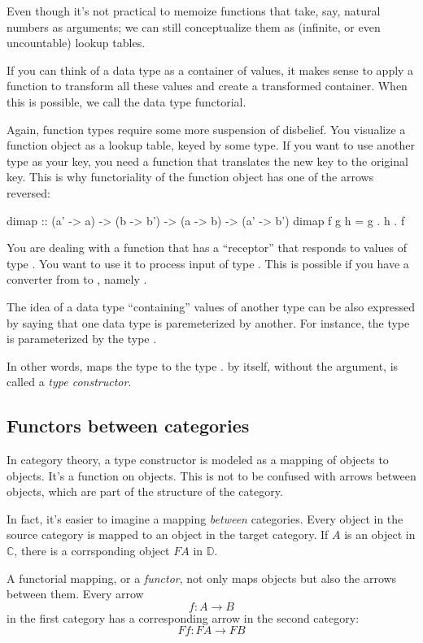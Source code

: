 \documentclass[DaoFP]{subfiles}
\begin{document}
Even though it's not practical to memoize functions that take, say, natural numbers as arguments; we can still conceptualize them as (infinite, or even uncountable) lookup tables.

If you can think of a data type as a container of values, it makes sense to apply a function to transform all these values and create a transformed container. When this is possible, we call the data type functorial. 

Again, function types require some more suspension of disbelief. You visualize a function object as a lookup table, keyed by some type. If you want to use another type as your key, you need a function that translates the new key to the original key. This is why functoriality of the function object has one of the arrows reversed:
\begin{haskell}
dimap :: (a' -> a) -> (b -> b') -> (a -> b) -> (a' -> b')
dimap f g h = g . h . f
\end{haskell}
You are dealing with a function  that has a ``receptor'' that responds to values of type . You want to use it to process input of type . This is possible if you have a converter from  to , namely .


The idea of a data type ``containing'' values of another type can be also expressed by saying that one data type is paremeterized by another. For instance, the type  is parameterized by the type . 

In other words,  maps the type  to the type .  by itself, without the argument, is called a \emph{type constructor}. 

\subsection{Functors between categories}
In category theory, a type constructor is modeled as a mapping of objects to objects. It's a function on objects. This is not to be confused with arrows between objects, which are part of the structure of the category. 

In fact, it's easier to imagine a mapping \emph{between} categories. Every object in the source category is mapped to an object in the target category. If $A$ is an object in $\mathbb{C}$, there is a corrsponding object $F A$ in $\mathbb{D}$.

A functorial mapping, or a \emph{functor}, not only maps objects but also the arrows between them. Every arrow 
\[ f \colon A \to B\]
in the first category has a corresponding arrow in the second category:
\[ F f \colon F A \to F B\]
\end{document}
